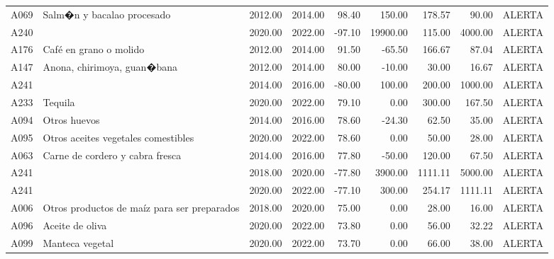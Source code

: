 \begin{table}[ht]
\begin{tabular}{llrrrrrrl}
  A069 & Salm�n y bacalao procesado & 2012.00 & 2014.00 & 98.40 & 150.00 & 178.57 & 90.00 & ALERTA \\ 
  A240 &  & 2020.00 & 2022.00 & -97.10 & 19900.00 & 115.00 & 4000.00 & ALERTA \\ 
  A176 & Café en grano o molido & 2012.00 & 2014.00 & 91.50 & -65.50 & 166.67 & 87.04 & ALERTA \\ 
  A147 & Anona, chirimoya, guan�bana & 2012.00 & 2014.00 & 80.00 & -10.00 & 30.00 & 16.67 & ALERTA \\ 
  A241 &  & 2014.00 & 2016.00 & -80.00 & 100.00 & 200.00 & 1000.00 & ALERTA \\ 
  A233 & Tequila & 2020.00 & 2022.00 & 79.10 & 0.00 & 300.00 & 167.50 & ALERTA \\ 
  A094 & Otros huevos & 2014.00 & 2016.00 & 78.60 & -24.30 & 62.50 & 35.00 & ALERTA \\ 
  A095 & Otros aceites vegetales comestibles & 2020.00 & 2022.00 & 78.60 & 0.00 & 50.00 & 28.00 & ALERTA \\ 
  A063 & Carne de cordero y cabra fresca & 2014.00 & 2016.00 & 77.80 & -50.00 & 120.00 & 67.50 & ALERTA \\ 
  A241 &  & 2018.00 & 2020.00 & -77.80 & 3900.00 & 1111.11 & 5000.00 & ALERTA \\ 
  A241 &  & 2020.00 & 2022.00 & -77.10 & 300.00 & 254.17 & 1111.11 & ALERTA \\ 
  A006 & Otros productos de maíz para ser preparados & 2018.00 & 2020.00 & 75.00 & 0.00 & 28.00 & 16.00 & ALERTA \\ 
  A096 & Aceite de oliva & 2020.00 & 2022.00 & 73.80 & 0.00 & 56.00 & 32.22 & ALERTA \\ 
  A099 & Manteca vegetal & 2020.00 & 2022.00 & 73.70 & 0.00 & 66.00 & 38.00 & ALERTA \\ 
   \bottomrule
\end{tabular}
\end{table}
